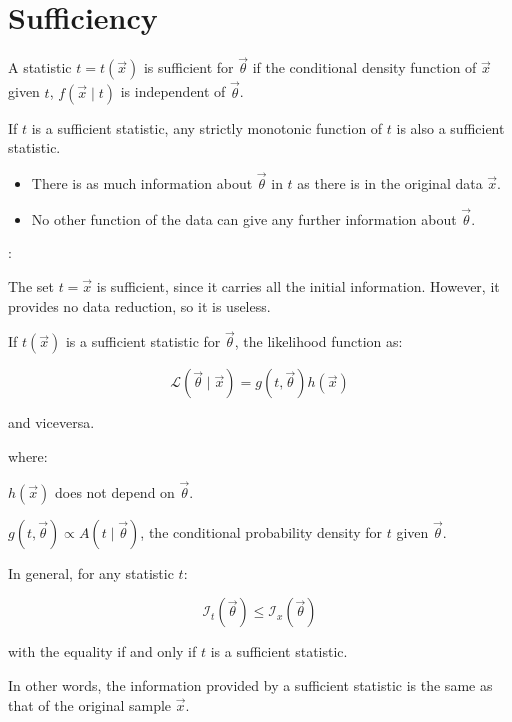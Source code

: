 

\section{Sufficiency}
\label{sec:sufficiency}

A statistic $t = t(\vec{x})$ is sufficient for $\vec{\theta}$ if the conditional density function of $\vec{x}$ given $t$, $f(\vec{x} \mid t)$ is independent of $\vec{\theta}$.

If $t$ is a sufficient statistic, any strictly monotonic function of $t$ is also a sufficient statistic.

\begin{itemize}[$\to$]
	\item There is as much information about $\vec{\theta}$ in $t$ as there is in the original data $\vec{x}$.
	\item No other function of the data can give any further information about $\vec{\theta}$.
\end{itemize}

:

The set $t = \vec{x}$ is sufficient, since it carries all the initial information. However, it provides no data reduction, so it is useless.

If $t(\vec{x})$ is a sufficient statistic for $\vec{\theta}$, the likelihood function as:

\begin{equation}\label{eq:likelihood_sufficiency}
	\mathcal{L}\left( \vec{\theta} \mid \vec{x} \right) 
	= g(t, \vec{\theta}) h(\vec{x})
\end{equation}

and viceversa.

where:

\begin{description}
	\item $h(\vec{x})$ does not depend on $\vec{\theta}$.
	\item $g(t, \vec{\theta}) \propto A(t \mid \vec{\theta})$, the conditional probability density for $t$ given $\vec{\theta}$.
\end{description}

In general, for any statistic $t$:

\begin{equation}
	\mathcal{I}_{t}(\vec{\theta}) \leq \mathcal{I}_{x}(\vec{\theta})
\end{equation}

with the equality if and only if $t$ is a sufficient statistic.

In other words, the information provided by a sufficient statistic is the same as that of the original sample $\vec{x}$.
